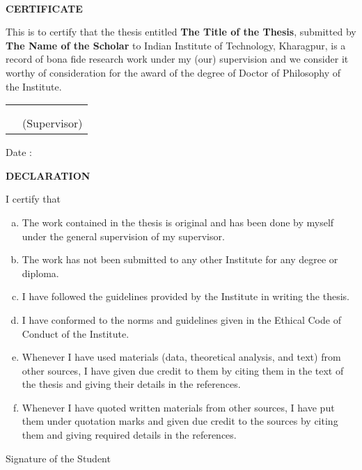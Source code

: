 \thispagestyle{empty}
{~} %
\vspace{10em} %
\begin{center}
\textbf{\large CERTIFICATE}
\end{center}
This is to certify that the thesis entitled \textbf{The Title of the Thesis}, submitted by \textbf{The Name of the Scholar} to Indian Institute of Technology, Kharagpur, is a record of bona fide research work under my (our) supervision and we consider it worthy of consideration for the award of the degree of Doctor of Philosophy of the Institute.
\begin{center}
\begin{tabular*}{\textwidth}{@{\extracolsep{\fill}}cc}
&\\
&\\
& (Supervisor)\\
\end{tabular*}
\end{center}
Date :

\newpage
\thispagestyle{empty}
\cleardoublepage

\thispagestyle{empty}
\begin{center}
\textbf{\large DECLARATION}
\end{center}
I certify that
\begin{enumerate}[a.]
 \item The work contained in the thesis is original and has been done by myself under the general supervision of my supervisor.
 \item The work has not been submitted to any other Institute for any degree or diploma.
 \item I have followed the guidelines provided by the Institute in writing the thesis.
 \item I have conformed to the norms and guidelines given in the Ethical Code of Conduct of the Institute.
 \item Whenever I have used materials (data, theoretical analysis, and text) from other sources, I have given due credit to them by citing them in the text of the thesis and giving their details in the references.
 \item Whenever I have quoted written materials from other sources, I have put them under quotation marks and given due credit to the sources by citing them and giving required details in the references.
\end{enumerate}
\vspace{4em}
\begin{flushright}
Signature of the Student
\end{flushright}

